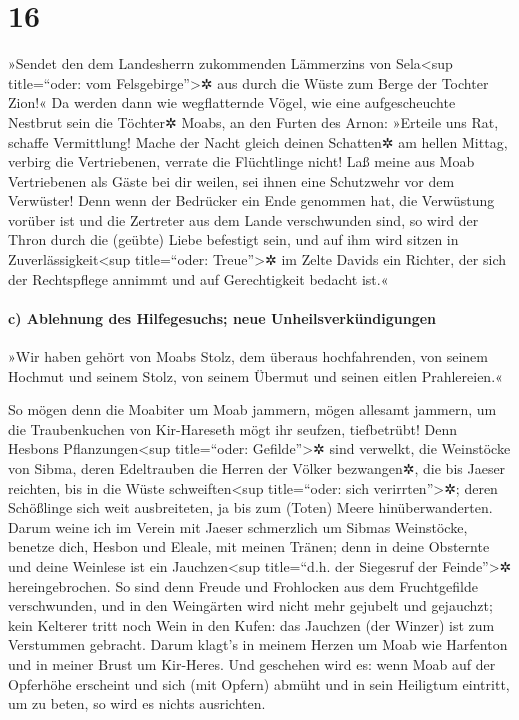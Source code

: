\hypertarget{section-15}{%
\section{16}\label{section-15}}

»Sendet den dem Landesherrn zukommenden Lämmerzins von
Sela\textless sup title=``oder: vom Felsgebirge''\textgreater✲ aus durch
die Wüste zum Berge der Tochter Zion!« Da werden dann wie
wegflatternde Vögel, wie eine aufgescheuchte Nestbrut sein die Töchter✲
Moabs, an den Furten des Arnon: »Erteile uns Rat, schaffe
Vermittlung! Mache der Nacht gleich deinen Schatten✲ am hellen Mittag,
verbirg die Vertriebenen, verrate die Flüchtlinge nicht!
Laß meine aus Moab Vertriebenen als Gäste bei dir weilen,
sei ihnen eine Schutzwehr vor dem Verwüster! Denn wenn der Bedrücker ein
Ende genommen hat, die Verwüstung vorüber ist und die Zertreter aus dem
Lande verschwunden sind, so wird der Thron durch die
(geübte) Liebe befestigt sein, und auf ihm wird sitzen in
Zuverlässigkeit\textless sup title=``oder: Treue''\textgreater✲ im Zelte
Davids ein Richter, der sich der Rechtspflege annimmt und auf
Gerechtigkeit bedacht ist.«

\hypertarget{c-ablehnung-des-hilfegesuchs-neue-unheilsverkuxfcndigungen}{%
\paragraph{c) Ablehnung des Hilfegesuchs; neue
Unheilsverkündigungen}\label{c-ablehnung-des-hilfegesuchs-neue-unheilsverkuxfcndigungen}}

»Wir haben gehört von Moabs Stolz, dem überaus
hochfahrenden, von seinem Hochmut und seinem Stolz, von seinem Übermut
und seinen eitlen Prahlereien.«

So mögen denn die Moabiter um Moab jammern, mögen allesamt
jammern, um die Traubenkuchen von Kir-Hareseth mögt ihr seufzen,
tiefbetrübt! Denn Hesbons Pflanzungen\textless sup
title=``oder: Gefilde''\textgreater✲ sind verwelkt, die Weinstöcke von
Sibma, deren Edeltrauben die Herren der Völker bezwangen✲, die bis
Jaeser reichten, bis in die Wüste schweiften\textless sup title=``oder:
sich verirrten''\textgreater✲; deren Schößlinge sich weit ausbreiteten,
ja bis zum (Toten) Meere hinüberwanderten. Darum weine ich
im Verein mit Jaeser schmerzlich um Sibmas Weinstöcke, benetze dich,
Hesbon und Eleale, mit meinen Tränen; denn in deine Obsternte und deine
Weinlese ist ein Jauchzen\textless sup title=``d.h. der Siegesruf der
Feinde''\textgreater✲ hereingebrochen. So sind denn
Freude und Frohlocken aus dem Fruchtgefilde verschwunden, und in den
Weingärten wird nicht mehr gejubelt und gejauchzt; kein Kelterer tritt
noch Wein in den Kufen: das Jauchzen (der Winzer) ist zum Verstummen
gebracht. Darum klagt's in meinem Herzen um Moab wie
Harfenton und in meiner Brust um Kir-Heres. Und geschehen
wird es: wenn Moab auf der Opferhöhe erscheint und sich (mit Opfern)
abmüht und in sein Heiligtum eintritt, um zu beten, so wird es nichts
ausrichten.

